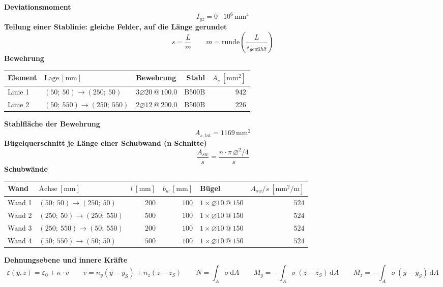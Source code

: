 \documentclass[11pt,a4paper]{article}
\begin{document}
\noindent\textbf{Deviationsmoment}
\begin{equation*}
I_{yz} = 0\,\cdot 10^{6}\,\mathrm{mm}^{4}
\end{equation*}
\noindent\textbf{Teilung einer Stablinie: gleiche Felder, auf die Länge gerundet}
\begin{equation*}
s = \frac{L}{m} \qquad m = \mathrm{runde}\left(\frac{L}{s_{gewählt}}\right)
\end{equation*}
\noindent\textbf{Bewehrung}
\begin{longtable}{lllrr}
\hline
Element & $\text{Lage}\ [\mathrm{mm}]$ & Bewehrung & Stahl & $A_s\ [\mathrm{mm}^2]$ \\
\hline
\endhead
Linie 1 & $(50;\ 50) \rightarrow (250;\ 50)$ & $3 \varnothing 20\ @\ 100.0$ & B500B & $942$ \\
Linie 2 & $(50;\ 550) \rightarrow (250;\ 550)$ & $2 \varnothing 12\ @\ 200.0$ & B500B & $226$ \\
\hline
\end{longtable}
\noindent\textbf{Stahlfläche der Bewehrung}
\begin{equation*}
A_{s,tot} = 1169\,\mathrm{mm}^{2}
\end{equation*}
\noindent\textbf{Bügelquerschnitt je Länge einer Schubwand (n Schnitte)}
\begin{equation*}
\frac{A_{sw}}{s} = \frac{n \cdot \pi\, \varnothing^2 / 4}{s}
\end{equation*}
\noindent\textbf{Schubwände}
\begin{longtable}{llrrlr}
\hline
Wand & $\text{Achse}\ [\mathrm{mm}]$ & $l\ [\mathrm{mm}]$ & $b_w\ [\mathrm{mm}]$ & Bügel & $A_{sw}/s\ [\mathrm{mm}^2/\mathrm{m}]$ \\
\hline
\endhead
Wand 1 & $(50;\ 50) \rightarrow (250;\ 50)$ & $200$ & $100$ & $1 \times \varnothing 10\ @\ 150$ & $524$ \\
Wand 2 & $(250;\ 50) \rightarrow (250;\ 550)$ & $500$ & $100$ & $1 \times \varnothing 10\ @\ 150$ & $524$ \\
Wand 3 & $(250;\ 550) \rightarrow (50;\ 550)$ & $200$ & $100$ & $1 \times \varnothing 10\ @\ 150$ & $524$ \\
Wand 4 & $(50;\ 550) \rightarrow (50;\ 50)$ & $500$ & $100$ & $1 \times \varnothing 10\ @\ 150$ & $524$ \\
\hline
\end{longtable}
\noindent\textbf{Dehnungsebene und innere Kräfte}
\begin{equation*}
\varepsilon(y, z) = \varepsilon_0 + \kappa \cdot v \qquad v = n_y (y - y_S) + n_z (z - z_S) \qquad N = \int_A \sigma\,\mathrm{d}A \qquad M_y = -\int_A \sigma\,(z - z_S)\,\mathrm{d}A \qquad M_z = -\int_A \sigma\,(y - y_S)\,\mathrm{d}A
\end{equation*}
\end{document}
